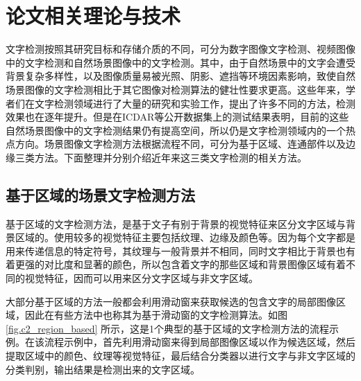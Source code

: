 ﻿%
%
%
%
%
%

\chapter{论文相关理论与技术}

    文字检测按照其研究目标和存储介质的不同，可分为数字图像文字检测、视频图像中的文字检测和自然场景图像中的文字检测。其中，由于自然场景中的文字会遭受背景复杂多样性，以及图像质量易被光照、阴影、遮挡等环境因素影响，致使自然场景图像的文字检测相比于其它图像对检测算法的健壮性要求更高。这些年来，学者们在文字检测领域进行了大量的研究和实验工作，提出了许多不同的方法，检测效果也在逐年提升。但是在ICDAR等公开数据集上的测试结果表明，目前的这些自然场景图像中的文字检测结果仍有提高空间，所以仍是文字检测领域内的一个热点方向。场景图像文字检测方法根据流程不同，可分为基于区域、连通部件以及边缘三类方法。下面整理并分别介绍近年来这三类文字检测的相关方法。

    \section{基于区域的场景文字检测方法}

    基于区域的文字检测方法，是基于文子有别于背景的视觉特征来区分文字区域与背景区域的。使用较多的视觉特征主要包括纹理、边缘及颜色等。因为每个文字都是用来传递信息的特定符号，其纹理与一般背景并不相同，同时文字相比于背景也有着更强的对比度和显著的颜色，所以包含着文字的那些区域和背景图像区域有着不同的视觉特征，因而可以用来区分文字区域与非文字区域。

    大部分基于区域的方法一般都会利用滑动窗来获取候选的包含文字的局部图像区域，因此在有些方法中也称其为基于滑动窗的文字检测算法。如图\ref{fig.c2_region_based} 所示，这是1个典型的基于区域的文字检测方法的流程示例。在该流程示例中，首先利用滑动窗来得到局部图像区域以作为候选区域，然后提取区域中的颜色、纹理等视觉特征，最后结合分类器以进行文字与非文字区域的分类判别，输出结果是检测出来的文字区域。

